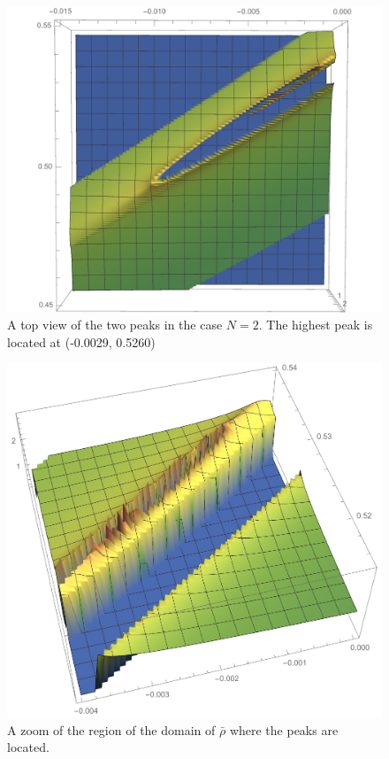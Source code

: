 \begin{figure}
\begin{center}
\includegraphics[scale=0.5]{Immagini/spiked3N2top.pdf}
\caption{A top view of the two peaks in the case $N=2$. The highest peak is located at (-0.0029, 0.5260)}
\label{fig:4}
\end{center}
\end{figure}



\begin{figure}
\begin{center}
\includegraphics[scale=0.5]{Immagini/spiked3N2-zoomed.pdf}
\caption{A zoom of the region of the domain of $\bar \rho$ where the peaks are located.}
\label{fig:5}
\end{center}
\end{figure}






